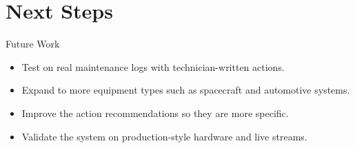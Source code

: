 \section{Next Steps}

\begin{frame}{Future Work}
  \begin{itemize}
    \item Test on real maintenance logs with technician-written actions.
    \item Expand to more equipment types such as spacecraft and automotive systems.
    \item Improve the action recommendations so they are more specific.
    \item Validate the system on production-style hardware and live streams.
  \end{itemize}
\end{frame}
